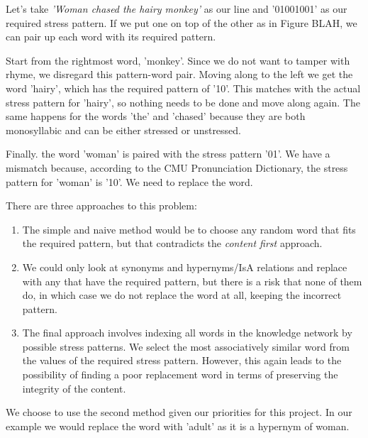 Let's take \textit{'Woman chased the hairy monkey'} as our line and '01001001' as our required stress pattern. If we put one on top of the other as in Figure BLAH, we can pair up each word with its required pattern.

Start from the rightmost word, 'monkey'. Since we do not want to tamper with rhyme, we disregard this pattern-word pair. Moving along to the left we get the word 'hairy', which has the required pattern of '10'. This matches with the actual stress pattern for 'hairy', so nothing needs to be done and move along again. The same happens for the words 'the' and 'chased' because they are both monosyllabic and can be either stressed or unstressed.

Finally. the word 'woman' is paired with the stress pattern '01'. We have a mismatch because, according to the CMU Pronunciation Dictionary, the stress pattern for 'woman' is '10'. We need to replace the word.

There are three approaches to this problem:
\begin{enumerate}
\item{The simple and naive method would be to choose any random word that fits the required pattern, but that contradicts the \textit{content first} approach.} 
\item{We could only look at synonyms and hypernyms/IsA relations and replace with any that have the required pattern, but there is a risk that none of them do, in which case we do not replace the word at all, keeping the incorrect pattern.} 
\item{The final approach involves indexing all words in the knowledge network by possible stress patterns. We select the most associatively similar word from the values of the required stress pattern. However, this again leads to the possibility of finding a poor replacement word in terms of preserving the integrity of the content.}
\end{enumerate}

We choose to use the second method given our priorities for this project. In our example we would replace the word with 'adult' as it is a hypernym of woman.





